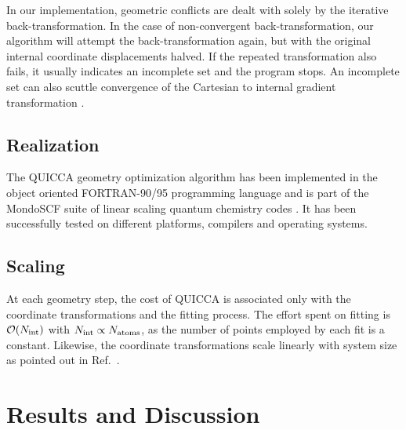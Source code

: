 \documentclass[prl,twocolumn,showpacs,twocolumngrid,superbib]{revtex4}
\begin{document}
In our implementation, geometric conflicts are dealt with solely by the iterative back-transformation.
In the case of non-convergent back-transformation,  our algorithm will attempt the back-transformation
again, but with the original internal coordinate displacements halved.  If the repeated transformation 
also fails, it usually indicates an incomplete set and the program stops.  An incomplete 
set can also scuttle convergence of the Cartesian to internal gradient transformation \cite{nemeth_coordtrf1}. 

\subsection{Realization}

The QUICCA geometry optimization algorithm has been implemented in the
object oriented FORTRAN-90/95 programming language and is part of
the MondoSCF suite of linear scaling quantum chemistry codes \cite{MondoSCF}.
It has been successfully tested on different platforms, compilers and operating
systems. 

\subsection{Scaling}

At each geometry step, the cost of QUICCA is associated only with the coordinate 
transformations and the fitting process.  The effort spent on fitting is 
$ {\cal O}(N_{\rm int})$ with $N_{\rm int} \propto N_{\rm atoms}$, as the number of 
points employed by each fit is a constant.  Likewise, the coordinate transformations scale linearly with system 
size as pointed out in Ref.~\cite{nemeth_coordtrf1}.

\section{Results and Discussion}
\end{document}
